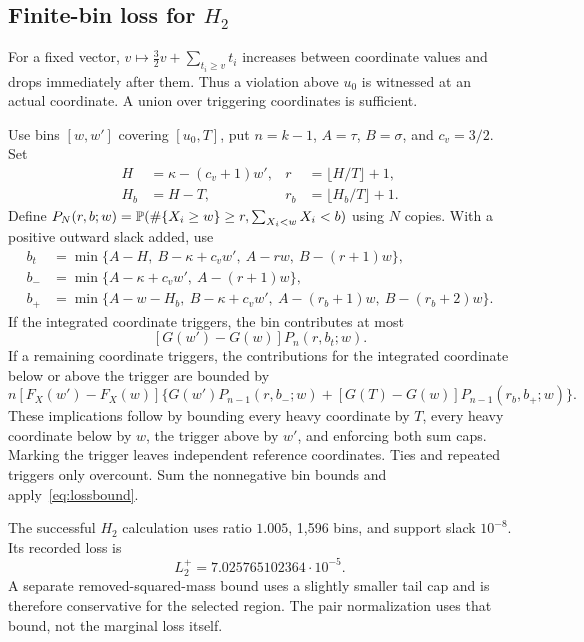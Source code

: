 \documentclass[11pt,a4paper]{article}
\theoremstyle{definition}\newtheorem{definition}[theorem]{Definition}
\theoremstyle{remark}\newtheorem{remark}[theorem]{Remark}
\numberwithin{equation}{section}
\begin{document}
\subsection{Finite-bin loss for \texorpdfstring{$H_2$}{H2}}
For a fixed vector, $v\mapsto\tfrac32v+\sum_{t_i\ge v}t_i$ increases between coordinate values and drops immediately after them. Thus a violation above $u_0$ is witnessed at an actual coordinate. A union over triggering coordinates is sufficient.

Use bins $[w,w']$ covering $[u_0,T]$, put $n=k-1$, $A=\tau$, $B=\sigma$, and $c_v=3/2$. Set
\begin{align*}
 H&=\kappa-(c_v+1)w',& r&=\lfloor H/T\rfloor+1,\\
 H_b&=H-T,&r_b&=\lfloor H_b/T\rfloor+1.
\end{align*}
Define $P_N(r,b;w)=\mathbb P(\#\{X_i\ge w\}\ge r,\sum_{X_i<w}X_i<b)$ using $N$ copies. With a positive outward slack added, use
\begin{align*}
 b_t&=\min\{A-H,\ B-\kappa+c_vw',\ A-rw,\ B-(r+1)w\},\\
 b_-&=\min\{A-\kappa+c_vw',\ A-(r+1)w\},\\
 b_+&=\min\{A-w-H_b,\ B-\kappa+c_vw',\ A-(r_b+1)w,\ B-(r_b+2)w\}.
\end{align*}
If the integrated coordinate triggers, the bin contributes at most
\[
 [G(w')-G(w)]P_n(r,b_t;w).
\]
If a remaining coordinate triggers, the contributions for the integrated coordinate below or above the trigger are bounded by
\[
 n[F_X(w')-F_X(w)]
 \{G(w')P_{n-1}(r,b_-;w)+[G(T)-G(w)]P_{n-1}(r_b,b_+;w)\}.
\]
These implications follow by bounding every heavy coordinate by $T$, every heavy coordinate below by $w$, the trigger above by $w'$, and enforcing both sum caps. Marking the trigger leaves independent reference coordinates. Ties and repeated triggers only overcount. Sum the nonnegative bin bounds and apply~\eqref{eq:lossbound}.

The successful $H_2$ calculation uses ratio $1.005$, 1,596 bins, and support slack $10^{-8}$. Its recorded loss is
\[
 L_2^+=7.025765102364\cdot10^{-5}.
\]
A separate removed-squared-mass bound uses a slightly smaller tail cap and is therefore conservative for the selected region. The pair normalization uses that bound, not the marginal loss itself.
\end{document}
